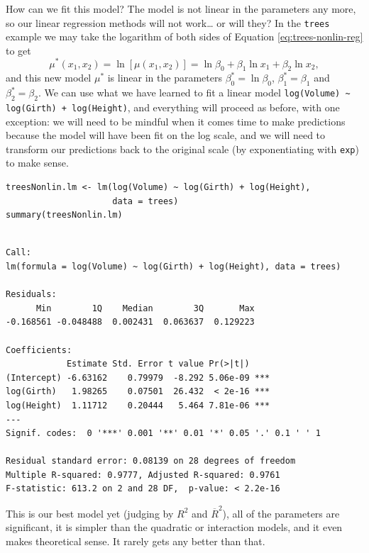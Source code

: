 \documentclass[captions=tableheading]{scrbook}
\begin{document}
How can we fit this model? The model is not linear in the parameters any more, so our linear regression methods will not work\ldots{} or will they? In the \texttt{trees} example we may take the logarithm of both sides of Equation \ref{eq:trees-nonlin-reg} to get
\begin{equation}
\mu^{\ast}(x_{1},x_{2})=\ln\left[\mu(x_{1},x_{2})\right]=\ln\beta_{0}+\beta_{1}\ln x_{1}+\beta_{2}\ln x_{2},
\end{equation}
and this new model \(\mu^{\ast}\) is linear in the parameters \(\beta_{0}^{\ast}=\ln\beta_{0}\), \(\beta_{1}^{\ast}=\beta_{1}\) and \(\beta_{2}^{\ast}=\beta_{2}\). We can use what we have learned to fit a linear model \texttt{log(Volume) \textasciitilde{} log(Girth) + log(Height)}, and everything will proceed as before, with one exception: we will need to be mindful when it comes time to make predictions because the model will have been fit on the log scale, and we will need to transform our predictions back to the original scale (by exponentiating with \texttt{exp}) to make sense.


\begin{verbatim}
treesNonlin.lm <- lm(log(Volume) ~ log(Girth) + log(Height), 
                     data = trees)
summary(treesNonlin.lm)
\end{verbatim}


\begin{verbatim}
 
Call:
lm(formula = log(Volume) ~ log(Girth) + log(Height), data = trees)

Residuals:
      Min        1Q    Median        3Q       Max 
-0.168561 -0.048488  0.002431  0.063637  0.129223 

Coefficients:
            Estimate Std. Error t value Pr(>|t|)    
(Intercept) -6.63162    0.79979  -8.292 5.06e-09 ***
log(Girth)   1.98265    0.07501  26.432  < 2e-16 ***
log(Height)  1.11712    0.20444   5.464 7.81e-06 ***
---
Signif. codes:  0 '***' 0.001 '**' 0.01 '*' 0.05 '.' 0.1 ' ' 1 

Residual standard error: 0.08139 on 28 degrees of freedom
Multiple R-squared: 0.9777,	Adjusted R-squared: 0.9761 
F-statistic: 613.2 on 2 and 28 DF,  p-value: < 2.2e-16
\end{verbatim}

This is our best model yet (judging by \(R^{2}\) and \(\overline{R}^{2}\)), all of the parameters are significant, it is simpler than the quadratic or interaction models, and it even makes theoretical sense. It rarely gets any better than that.
\end{document}
